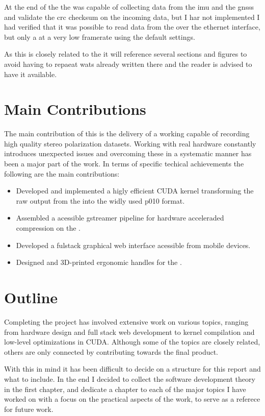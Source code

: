 At the end of the \preproject the \sr was capable of collecting data from the \gls{imu} and the \glspl{gnss} and validate the \gls{crc} checksum on the incoming data, but I har not implemented
I had verified that it was possible to read data from the \cams over the ethernet interface, but only a at a very low framerate using the default settings.

As this \master is closely related to the \preproject it will reference several sections and figures to avoid having to repaeat wats already written there and the reader is advised to have it available.

\section{Main Contributions}
The main contribution of this \master is the delivery of a working \sr capable of recording high quality stereo polarization datasets.
Working with real hardware constantly introduces unexpected issues and overcoming these in a systematic manner has been a major part of the work.
In terms of specific techical achievements the following are the main contributions:

\begin{itemize}
    \item Developed and implemented a higly efficient CUDA kernel transforming the raw output from the \cams into the widly used \gls{p010} format.
    \item Assembled a \py acessible \gls{gstreamer} pipeline for hardware acceleraded compression on the \jx.
    \item Developed a fulstack graphical web interface acessible from mobile devices.
    \item Designed and 3D-printed ergonomic handles for the \sr.
\end{itemize}


\section{Outline}
Completing the \sr project has involved extensive work on various topics, ranging from hardware design and full stack web development to kernel compilation and low-level optimizations in CUDA.
Although some of the topics are closely related, others are only connected  by contributing towards the final product.

With this in mind it has been difficult to decide on a structure for this report and what to include.
In the end I decided to collect the software development theory in the first chapter, and dedicate a chapter to each of the major topics I have worked on with a focus on the practical aspects of the work, to serve as a referece for future work.

